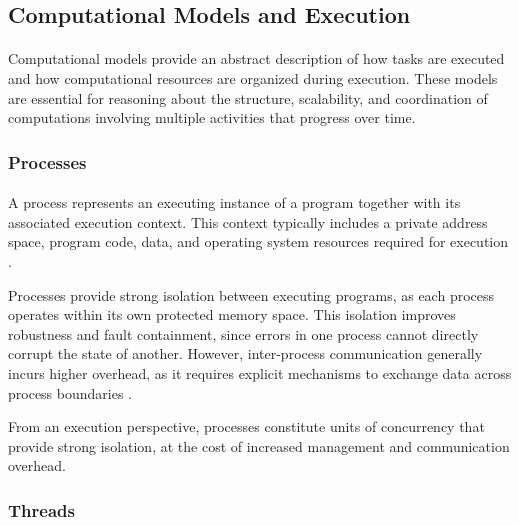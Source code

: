 \subsection{Computational Models and Execution}
\paragraph{}

Computational models provide an abstract description of how tasks are executed and how
computational resources are organized during execution. These models are essential for reasoning
about the structure, scalability, and coordination of computations involving multiple activities
that progress over time.

\subsubsection{Processes}
\paragraph{}

A process represents an executing instance of a program together with its associated execution
context. This context typically includes a private address space, program code, data, and
operating system resources required for execution \cite{tanenbaum2015modern}.

Processes provide strong isolation between executing programs, as each process operates within
its own protected memory space. This isolation improves robustness and fault containment, since
errors in one process cannot directly corrupt the state of another. However, inter-process
communication generally incurs higher overhead, as it requires explicit mechanisms to exchange
data across process boundaries \cite{silberschatz2018operating}.

From an execution perspective, processes constitute units of concurrency that provide strong
isolation, at the cost of increased management and communication overhead.



\subsubsection{Threads}
\paragraph{}

